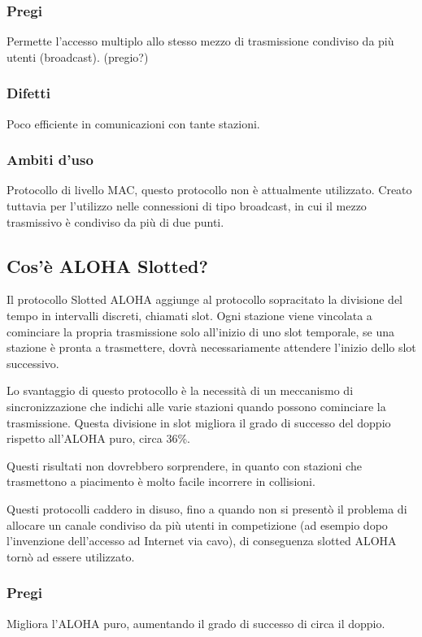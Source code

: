 \subsubsection{Pregi}
Permette l'accesso multiplo allo stesso mezzo di trasmissione condiviso da più utenti (broadcast). (pregio?)

\subsubsection{Difetti}
Poco efficiente in comunicazioni con tante stazioni.

\subsubsection{Ambiti d'uso}
Protocollo di livello MAC, questo protocollo non è attualmente utilizzato.
Creato tuttavia per l'utilizzo nelle connessioni di tipo broadcast, in cui il mezzo trasmissivo è condiviso da più di due punti.

\subsection{Cos'è ALOHA Slotted?}
Il protocollo Slotted ALOHA aggiunge al protocollo sopracitato la divisione del tempo in intervalli discreti, chiamati slot.
Ogni stazione viene vincolata a cominciare la propria trasmissione solo all'inizio di uno slot temporale,
se una stazione è pronta a trasmettere, dovrà necessariamente attendere l'inizio dello slot successivo.

Lo svantaggio di questo protocollo è la necessità di un meccanismo di sincronizzazione che indichi alle varie stazioni quando possono cominciare la trasmissione.
Questa divisione in slot migliora il grado di successo del doppio rispetto all'ALOHA puro, circa 36\%.

Questi risultati non dovrebbero sorprendere, in quanto con stazioni che trasmettono a piacimento è molto facile incorrere in collisioni.

Questi protocolli caddero in disuso, fino a quando non si presentò il problema di allocare un canale condiviso da più utenti in competizione
(ad esempio dopo l'invenzione dell'accesso ad Internet via cavo), di conseguenza slotted ALOHA tornò ad essere utilizzato.

\subsubsection{Pregi}
Migliora l'ALOHA puro, aumentando il grado di successo di circa il doppio.

